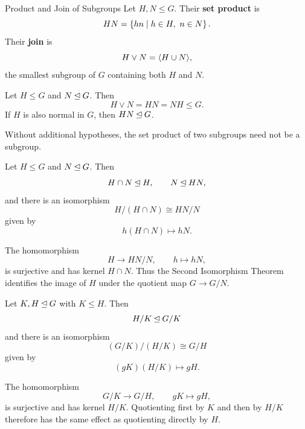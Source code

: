 \documentclass[12pt,a4paper]{article}
\begin{document}
    \begin{defi}{Product and Join of Subgroups}
        Let $H,N \le G$. Their \textbf{set product} is
        \[
            HN = \left\{ hn \mid h \in H,\ n \in N \right\}.
        \]
        Their \textbf{join} is
        \[
            H \vee N = \langle H \cup N \rangle,
        \]
        the smallest subgroup of $G$ containing both $H$ and $N$.
    \end{defi}
    \bigskip
    
    \begin{lemma}
        Let $H \le G$ and $N \unlhd G$. Then
        \[
            H \vee N = HN = NH \le G.
        \]
        If $H$ is also normal in $G$, then $HN \unlhd G$.
    \end{lemma}
    \bigskip
    
    \begin{remark}
        Without additional hypotheses, the set product of two
        subgroups need not be a subgroup.
    \end{remark}
    \bigskip
    
    \begin{thm}
        Let $H \le G$ and $N \unlhd G$. Then
        \[
            H \cap N \unlhd H,
            \qquad
            N \unlhd HN,
        \]
        and there is an isomorphism
        \[
            \boxed{H/(H \cap N) \cong HN/N}
        \]
        given by
        \[
            h(H \cap N) \longmapsto hN.
        \]
    \end{thm}
    \bigskip
    
    \begin{remark}
        The homomorphism
        \[
            H \to HN/N,\qquad h \mapsto hN,
        \]
        is surjective and has kernel $H \cap N$.
        Thus the Second Isomorphism Theorem identifies the image
        of $H$ under the quotient map $G \to G/N$.
    \end{remark}
    \bigskip
    
    \begin{thm}
        Let $K,H \unlhd G$ with $K \le H$. Then
        \[
            H/K \unlhd G/K
        \]
        and there is an isomorphism
        \[
            \boxed{(G/K)/(H/K) \cong G/H}
        \]
        given by
        \[
            (gK)(H/K) \longmapsto gH.
        \]
    \end{thm}
    \bigskip
    
    \begin{remark}
        The homomorphism
        \[
            G/K \to G/H,\qquad gK \mapsto gH,
        \]
        is surjective and has kernel $H/K$.
        Quotienting first by $K$ and then by $H/K$ therefore has
        the same effect as quotienting directly by $H$.
    \end{remark}
    \bigskip
\end{document}
